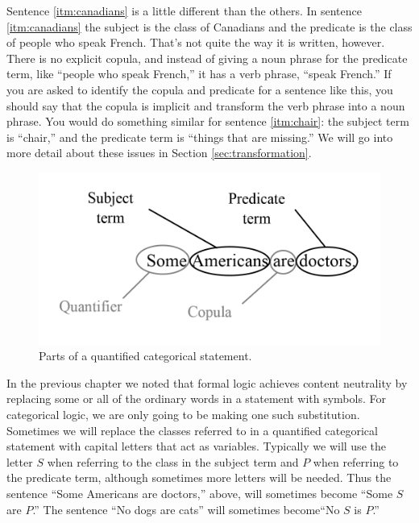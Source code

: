Sentence \ref{itm:canadians} is a little different than the others. In sentence \ref{itm:canadians} the subject is the class of Canadians and the predicate is the class of people who speak French. That's not quite the way it is written, however. There is no explicit copula, and instead of giving a noun phrase for the predicate term, like ``people who speak French,'' it has a verb phrase, ``speak French.'' If you are asked to identify the copula and predicate for a sentence like this, you should say that the copula is implicit and transform the verb phrase into a noun phrase. You would do something similar for sentence \ref{itm:chair}: the subject term is ``chair,'' and the predicate term is ``things that are missing.'' We will go into more detail about these issues in Section \ref{sec:transformation}.  


\begin{figure}
\begin{mdframed}[style=mytableclearbox]
\includegraphics*[width=\linewidth]{img/partsofacategoricalstatement}
\end{mdframed}
\caption{Parts of a quantified categorical statement.}
\label{fig:Partsofacategoricalstatement}
\end{figure}

In the previous chapter we noted that formal logic achieves content neutrality by replacing some or all of the ordinary words in a statement with symbols. For categorical logic, we are only going to be making one such substitution. Sometimes we will replace the classes referred to in a quantified categorical statement with capital letters that act as variables. Typically we will use the letter $S$ when referring to the class in the subject term and $P$ when referring to the predicate term, although sometimes more letters will be needed. Thus the sentence ``Some Americans are doctors,'' above, will sometimes become ``Some $S$ are $P$.'' The sentence ``No dogs are cats'' will sometimes become``No $S$ is $P$.''


